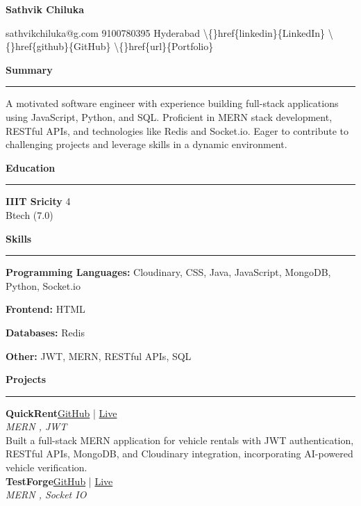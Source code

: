 \documentclass[10pt,a4paper]{article}
\begin{document}
\begin{center}
{\bfseries\fontsize{22}{26}\selectfont Sathvik Chiluka}\par
{\small sathvikchiluka@g.com \textbar{} 9100780395 \textbar{} Hyderabad \textbar{} \textbackslash\{\}href\{linkedin\}\{LinkedIn\} \textbar{} \textbackslash\{\}href\{github\}\{GitHub\} \textbar{} \textbackslash\{\}href\{url\}\{Portfolio\}}
\end{center}
\vspace{0.2cm}

\noindent\textbf{Summary}\par
\rule{\linewidth}{0.5pt}\par
A motivated software engineer with experience building full-stack applications using JavaScript, Python, and SQL. Proficient in MERN stack development, RESTful APIs, and technologies like Redis and Socket.io. Eager to contribute to challenging projects and leverage skills in a dynamic environment.
\vspace{0.2cm}

\noindent\textbf{Education}\par
\rule{\linewidth}{0.5pt}\par
\textbf{IIIT Sricity} \hfill 4\\
Btech (7.0)\\

\vspace{0.2cm}

\noindent\textbf{Skills}\par
\rule{\linewidth}{0.5pt}\par
\textbf{Programming Languages:} Cloudinary, CSS, Java, JavaScript, MongoDB, Python, Socket.io\par
\textbf{Frontend:} HTML\par
\textbf{Databases:} Redis\par
\textbf{Other:} JWT, MERN, RESTful APIs, SQL
\vspace{0.2cm}

\noindent\textbf{Projects}\par
\rule{\linewidth}{0.5pt}\par
\textbf{QuickRent}\hfill \href{git}{GitHub} | \href{url}{Live}\\
\textit{MERN , JWT}\\

Built a full-stack MERN application for vehicle rentals with JWT authentication, RESTful APIs, MongoDB, and Cloudinary integration, incorporating AI-powered vehicle verification.\\
\textbf{TestForge}\hfill \href{github}{GitHub} | \href{url}{Live}\\
\textit{MERN , Socket IO}\\
\end{document}
